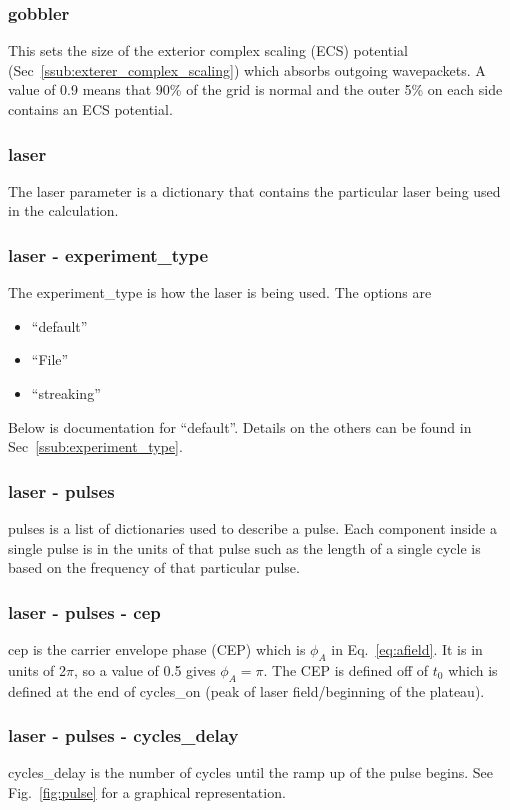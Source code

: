 \documentclass{article}
\begin{document}
\subsubsection{gobbler}
This sets the size of the exterior complex scaling (ECS) potential (Sec~\ref{ssub:exterer_complex_scaling}) which absorbs outgoing wavepackets. A value of 0.9 means that 90\% of the grid is normal and the outer 5\% on each side contains an ECS potential.

\subsubsection{laser}
The laser parameter is a dictionary that contains the particular laser being used in the calculation.

\subsubsection{laser - experiment\_type}
The experiment\_type is how the laser is being used. The options are
\begin{itemize}
  \item ``default''
  \item ``File''
  \item ``streaking''
\end{itemize}
Below is documentation for ``default''. Details on the others can be found in Sec~\ref{ssub:experiment_type}.

\subsubsection{laser - pulses}
pulses is a list of dictionaries used to describe a pulse. Each component inside a single pulse is in the units of that pulse such as the length of a single cycle is based on the frequency of that particular pulse.

\subsubsection{laser - pulses - cep}
cep is the carrier envelope phase (CEP) which is $\phi_A$ in Eq.~\ref{eq:afield}. It is in units of 2$\pi$, so a value of 0.5 gives $\phi_A=\pi$. The CEP is defined off of $t_0$ which is defined at the end of cycles\_on (peak of laser field/beginning of the plateau).

\subsubsection{laser - pulses - cycles\_delay}
cycles\_delay is the number of cycles until the ramp up of the pulse begins. See Fig.~\ref{fig:pulse} for a graphical representation.
\end{document}
